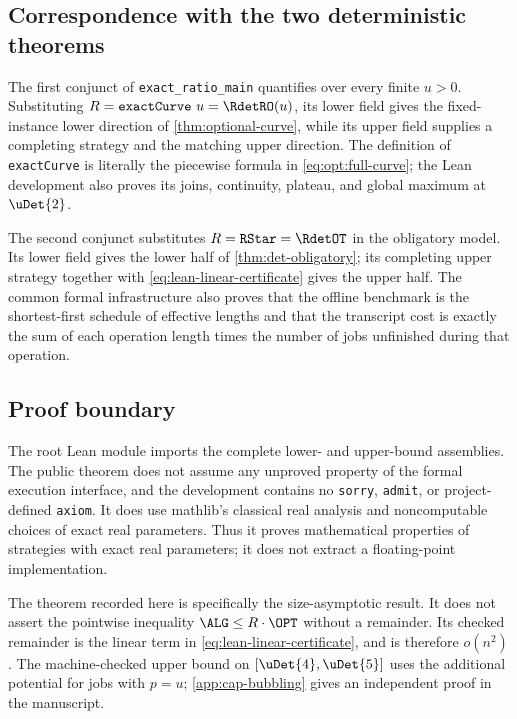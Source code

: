 \subsection{Correspondence with the two deterministic theorems}

The first conjunct of \texttt{exact\_ratio\_main} quantifies over every
finite \(u>0\).  Substituting \(R=\texttt{exactCurve}\ u=\RdetRO(u)\), its lower
field gives the fixed-instance lower direction of
\cref{thm:optional-curve}, while its upper field supplies a completing
strategy and the matching upper direction.  The definition of
\texttt{exactCurve} is literally the piecewise formula in
\cref{eq:opt:full-curve}; the Lean development also proves its joins,
continuity, plateau, and global maximum at \(\uDet{2}\).

The second conjunct substitutes \(R=\texttt{RStar}=\RdetOT\) in the
obligatory model.  Its lower field gives the lower half of
\cref{thm:det-obligatory}; its completing upper strategy together with
\eqref{eq:lean-linear-certificate} gives the upper half.  The common formal
infrastructure also
proves that the offline benchmark is the shortest-first schedule of
effective lengths and that the transcript cost is exactly the sum of each
operation length times the number of jobs unfinished during that operation.

\subsection{Proof boundary}

The root Lean module imports the complete lower- and upper-bound assemblies.
The public theorem does not assume any unproved property of the formal
execution interface, and the
development contains no \texttt{sorry}, \texttt{admit}, or project-defined
\texttt{axiom}.  It does use mathlib's classical real analysis and
noncomputable choices of exact real parameters.  Thus it proves mathematical
properties of strategies with exact real parameters; it does not extract a
floating-point implementation.

The theorem recorded here is specifically the size-asymptotic result.  It
does not assert the pointwise inequality \(\ALG\le R\cdot\OPT\) without a
remainder.  Its checked remainder is the linear term in
\eqref{eq:lean-linear-certificate}, and is therefore $o(n^2)$.  The
machine-checked upper bound on $[\uDet{4},\uDet{5}]$ uses the additional
potential for jobs with $p=u$; \cref{app:cap-bubbling} gives an independent
proof in the manuscript.
